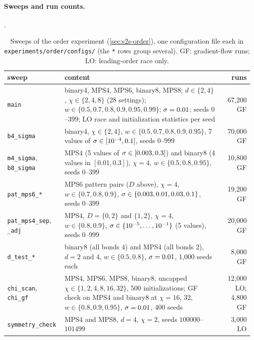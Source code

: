 \paragraph{Sweeps and run counts.} .

\begin{table}[ht]
  \centering
  \caption{Sweeps of the order experiment (\cref{sec:s2s-order}), one configuration file each in
    \texttt{experiments/order/configs/} (the \texttt{*} rows group several). GF: gradient-flow runs; LO:
    leading-order race only.}
  \label{tab:exp-order}
  \footnotesize
  \begin{tabularx}{\textwidth}{@{}>{\raggedright\arraybackslash}p{2.6cm}X r@{}}
    \toprule
    sweep & content & runs \\
    \midrule
    \texttt{main} & binary4, MPS4, MPS6, binary8, MPS8; $d\in\{2,4\}$, $\chi\in\{2,4,8\}$ (28 settings);
      $w\in\{0.5,0.7,0.8,0.9,0.95,0.99\}$; $\sigma=0.01$; seeds $0$--$399$; LO race and initialization statistics
      per seed & 67,200 GF \\
    \texttt{b4\_sigma} & binary4, $\chi\in\{2,4\}$, $w\in\{0.5,0.7,0.8,0.9,0.95\}$, 7 values of
      $\sigma\in[10^{-4},0.1]$, seeds $0$--$999$ & 70,000 GF \\
    \texttt{m4\_sigma}, \texttt{b8\_sigma} & MPS4 (5 values of $\sigma\in[0.003,0.3]$) and binary8 (4 values in
      $[0.01,0.3]$), $\chi=4$, $w\in\{0.5,0.8,0.95\}$, seeds $0$--$399$ & 10,800 GF \\
    \texttt{pat\_mps6\_*} & MPS6 pattern pairs ($D$ above), $\chi=4$, $w\in\{0.7,0.8,0.9\}$,
      $\sigma\in\{0.003,0.01,0.03,0.1\}$, seeds $0$--$399$ & 19,200 GF \\
    \texttt{pat\_mps4\_sep}, \texttt{\_adj} & MPS4, $D=\{0,2\}$ and $\{1,2\}$, $\chi=4$, $w\in\{0.8,0.9\}$,
      $\sigma\in\{10^{-5},\dots,10^{-1}\}$ (5 values), seeds $0$--$999$ & 20,000 GF \\
    \texttt{d\_test\_*} & binary8 (all bonds 4) and MPS4 (all bonds 2), $d=2$ and $4$, $w\in\{0.5,0.8\}$,
      $\sigma=0.01$, 1,000 seeds each & 8,000 GF \\
    \texttt{chi\_scan}, \texttt{chi\_gf} & MPS4, MPS6, MPS8, binary8, uncapped $\chi\in\{1,2,4,8,16,32\}$, 500
      initializations; GF check on MPS4 and binary8 at $\chi=16$, $32$, $w\in\{0.8,0.9,0.95\}$, $\sigma=0.01$, 400 seeds &
      12,000 LO; 4,800 GF \\
    \texttt{symmetry\_check} & MPS4 and MPS8, $d=4$, $\chi=2$, seeds $100000$--$101499$ & 3,000 LO \\

\end{tabularx}
\end{table}

